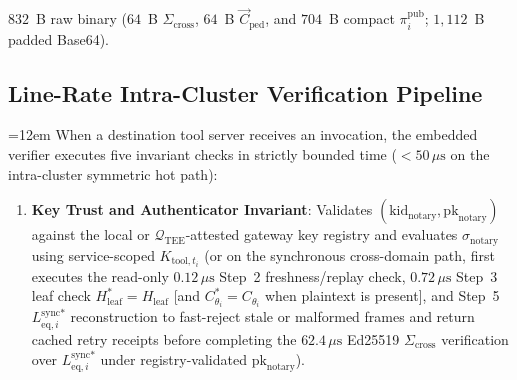 \documentclass[conference,10pt]{IEEEtran}
\begin{document}
$832$~B raw binary ($64$~B $\Sigma_{\text{cross}}$, $64$~B $\vec{C}_{\text{ped}}$, and $704$~B compact $\pi_i^{\text{pub}}$; $1{,}112$~B padded Base64).

\subsection{Line-Rate Intra-Cluster Verification Pipeline}
{\sloppy\hfuzz=1.0pt\emergencystretch=12em
When a destination tool server receives an invocation, the embedded verifier executes five invariant checks in strictly bounded time ($< 50\,\mu\text{s}$ on the intra-cluster symmetric hot path):
\begin{enumerate}
    \item \textbf{Key Trust and Authenticator Invariant}: Validates $(\text{kid}_{\text{notary}},\allowbreak \text{pk}_{\text{notary}})$ against the local or $\mathcal{Q}_{\text{TEE}}$-attested gateway key registry and evaluates $\sigma_{\text{notary}}$ using service-scoped $K_{\text{tool}, t_i}$ (or on the synchronous cross-domain path, first executes the read-only $0.12\,\mu\text{s}$ Step~2 freshness/replay check, $0.72\,\mu\text{s}$ Step~3 leaf check $H_{\text{leaf}}^* =\allowbreak H_{\text{leaf}}$ [and $C_{\theta_i}^* =\allowbreak C_{\theta_i}$ when plaintext is present], and Step~5 $L_{\text{eq}, i}^{\text{sync}*}$ reconstruction to fast-reject stale or malformed frames and return cached retry receipts before completing the $62.4\,\mu\text{s}$ Ed25519 $\Sigma_{\text{cross}}$ verification over $L_{\text{eq}, i}^{\text{sync}*}$ under registry-validated $\text{pk}_{\text{notary}}$).

\end{enumerate}}
\end{document}
